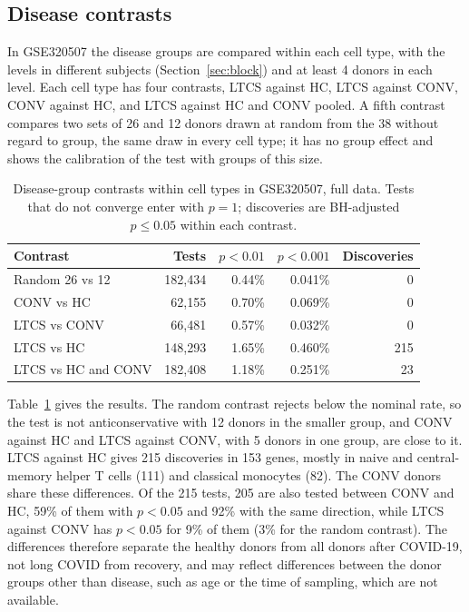 \documentclass[11pt]{article}
\begin{document}
\subsection{Disease contrasts}

In GSE320507 the disease groups are compared within each cell type, with the levels in different subjects (Section~\ref{sec:block}) and at least 4 donors in each level. Each cell type has four contrasts, LTCS against HC, LTCS against CONV, CONV against HC, and LTCS against HC and CONV pooled. A fifth contrast compares two sets of 26 and 12 donors drawn at random from the 38 without regard to group, the same draw in every cell type; it has no group effect and shows the calibration of the test with groups of this size.

\begin{table}[ht]
\centering
\small
\begin{tabular}{lrrrr}
\toprule
Contrast & Tests & $p<0.01$ & $p<0.001$ & Discoveries\\
\midrule
Random 26 vs 12 & 182{,}434 & 0.44\% & 0.041\% & 0\\
CONV vs HC & 62{,}155 & 0.70\% & 0.069\% & 0\\
LTCS vs CONV & 66{,}481 & 0.57\% & 0.032\% & 0\\
LTCS vs HC & 148{,}293 & 1.65\% & 0.460\% & 215\\
LTCS vs HC and CONV & 182{,}408 & 1.18\% & 0.251\% & 23\\
\bottomrule
\end{tabular}
\caption{Disease-group contrasts within cell types in GSE320507, full data. Tests that do not converge enter with $p=1$; discoveries are BH-adjusted $p\le0.05$ within each contrast.}
\label{tab:disease}
\end{table}

Table~\ref{tab:disease} gives the results. The random contrast rejects below the nominal rate, so the test is not anticonservative with 12 donors in the smaller group, and CONV against HC and LTCS against CONV, with 5 donors in one group, are close to it. LTCS against HC gives 215 discoveries in 153 genes, mostly in naive and central-memory helper T cells (111) and classical monocytes (82). The CONV donors share these differences. Of the 215 tests, 205 are also tested between CONV and HC, 59\% of them with $p<0.05$ and 92\% with the same direction, while LTCS against CONV has $p<0.05$ for 9\% of them (3\% for the random contrast). The differences therefore separate the healthy donors from all donors after COVID-19, not long COVID from recovery, and may reflect differences between the donor groups other than disease, such as age or the time of sampling, which are not available.
\end{document}
